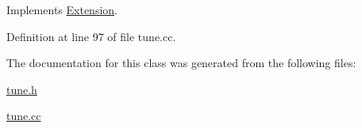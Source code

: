 Implements \hyperlink{classExtension_a934ee9dd373d61a41ea98f919e9abcbd}{Extension}.



Definition at line 97 of file tune.cc.



The documentation for this class was generated from the following files:\begin{DoxyCompactItemize}
\item 
\hyperlink{tune_8h}{tune.h}\item 
\hyperlink{tune_8cc}{tune.cc}\end{DoxyCompactItemize}

